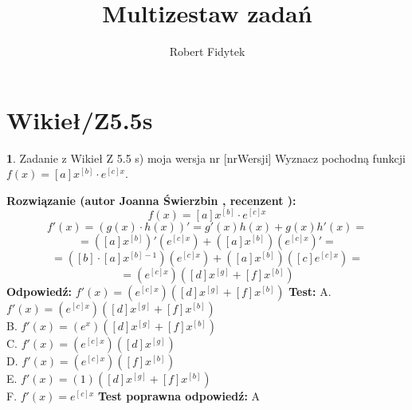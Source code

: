 \documentclass[12pt, a4paper]{article}
\title{Multizestaw zadań}
\author{Robert Fidytek}
\date{}
\theoremstyle{definition} %
\newtheorem{zad}{}
\newcommand{\kategoria}[1]{\section{#1}} %
\newcommand{\zadStart}[1]{\begin{zad}#1\newline} %
\newcommand{\zadStop}{\end{zad}}   %
\newcommand{\rozwStart}[2]{\noindent \textbf{Rozwiązanie (autor #1 , recenzent #2): }\newline} %
\newcommand{\rozwStop}{\newline}                                            %
\newcommand{\odpStart}{\noindent \textbf{Odpowiedź:}\newline}    %
\newcommand{\odpStop}{\newline}                                             %
\newcommand{\testStart}{\noindent \textbf{Test:}\newline} %
\newcommand{\testStop}{\newline} %
\newcommand{\kluczStart}{\noindent \textbf{Test poprawna odpowiedź:}\newline} %
\newcommand{\kluczStop}{\newline} %
\begin{document}
\maketitle


\kategoria{Wikieł/Z5.5s}
\zadStart{Zadanie z Wikieł Z 5.5 s) moja wersja nr [nrWersji]}
Wyznacz pochodną funkcji \\ $f(x)=[a]x^{[b]} \cdot e^{[c]x} $.
\zadStop
\rozwStart{Joanna Świerzbin}{}
$$f(x)=[a]x^{[b]} \cdot e^{[c]x} $$
$$f'(x)=(g(x)\cdot h(x))'=g'(x)h(x)+g(x)h'(x)=$$ $$ =([a]x^{[b]})'(e^{[c]x}) +([a]x^{[b]})(e^{[c]x})' =$$
$$ =([b]\cdot[a]x^{[b]-1})(e^{[c]x}) +([a]x^{[b]})([c]e^{[c]x}) =$$
$$ =(e^{[c]x})([d]x^{[g]}+ [f]x^{[b]}) $$
\rozwStop
\odpStart
$ f'(x) =(e^{[c]x})([d]x^{[g]}+ [f]x^{[b]}) $
\odpStop
\testStart
A. $ f'(x) =(e^{[c]x})([d]x^{[g]}+ [f]x^{[b]}) $\\
B. $ f'(x) =(e^{x})([d]x^{[g]}+ [f]x^{[b]}) $\\
C. $ f'(x) =(e^{[c]x})([d]x^{[g]}) $\\
D. $ f'(x) =(e^{[c]x})([f]x^{[b]}) $\\
E. $ f'(x) =(1)([d]x^{[g]}+ [f]x^{[b]}) $\\
F. $ f'(x) =e^{[c]x} $
\testStop
\kluczStart
A
\kluczStop
\end{document}
